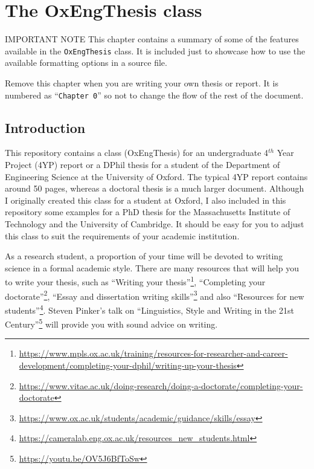 \setcounter{chapter}{-1}
\chapter{The OxEngThesis \latex class}



\begin{OxWarningBox}{IMPORTANT NOTE}
This chapter contains a summary of some of the features available in the \verb|OxEngThesis| class. It is included just to showcase how to use the available formatting options in a \latex source file.

Remove this chapter when you are writing your own thesis or report. It is numbered as ``\verb|Chapter 0|'' so not to change the flow of the rest of the document.
\end{OxWarningBox}


\section{Introduction}


This repository contains a \latex class (OxEngThesis) for an undergraduate 4$^{th}$ Year Project (4YP) report or a DPhil thesis for a student of the Department of Engineering Science at the University of Oxford. The typical 4YP report contains around 50 pages, whereas a doctoral thesis is a much larger document. Although I originally created this class for a student at Oxford, I also included in this repository some examples for a PhD thesis for the Massachusetts Institute of Technology and the University of Cambridge. It should be easy for you to adjust this class to suit the requirements of your academic institution.

As a research student, a proportion of your time will be devoted to writing science in a formal academic style. There are many resources that will help you to write your thesis, such as ``Writing your thesis''\footnote{\url{https://www.mpls.ox.ac.uk/training/resources-for-researcher-and-career-development/completing-your-dphil/writing-up-your-thesis}}, ``Completing your doctorate''\footnote{\url{https://www.vitae.ac.uk/doing-research/doing-a-doctorate/completing-your-doctorate}}, ``Essay and dissertation writing skills''\footnote{\url{https://www.ox.ac.uk/students/academic/guidance/skills/essay}} and also ``Resources for new students''\footnote{\url{https://cameralab.eng.ox.ac.uk/resources_new_students.html}}. Steven Pinker's talk on ``Linguistics, Style and Writing in the 21st Century''\footnote{\url{https://youtu.be/OV5J6BfToSw}} will provide you with sound advice on writing. 

